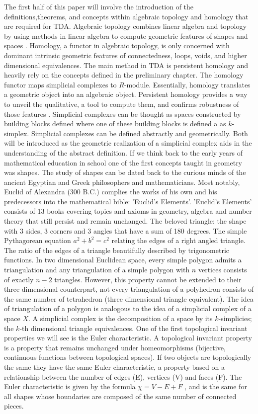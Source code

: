 \documentclass{article}
\begin{document}
The first half of this paper will involve the introduction of the definitions,theorems, and concepts within algebraic topology and homology that are required for TDA. Algebraic topology combines linear algebra and topology by using methods in linear algebra to compute geometric features of shapes and spaces\cite{AZComputePH} \cite{Maleti__2016} \cite{AZadvances}. Homology, a functor in algebraic topology, is only concerned with dominant intrinsic geometric features of connectedness, loops, voids, and higher dimensional equivalences. The main method in TDA is persistent homology and heavily rely on the concepts defined in the preliminary chapter. The homology functor maps simplicial complexes to $R$-module. Essentially, homology translates a geometric object into an algebraic object. Persistent homology provides a way to unveil the qualitative, a tool to compute them, and confirms robustness of those features \cite{smith2020topological}. Simplicial complexes can be thought as spaces constructed by building blocks defined where one of these building blocks is defined a as $k$-simplex. Simplicial complexes can be defined abstractly and geometrically. Both will be introduced as the geometric realization of a simplicial complex aids in the understanding of the abstract definition. If we think back to the early years of mathematical education in school one of the first concepts taught in geometry was shapes. The study of shapes can be dated back to the curious minds of the ancient Egyptian and Greek philosophers and mathematicians. Most notably, Euclid of Alexandra (300 B.C.) complies the works of his own and his predecessors into the mathematical bible: 'Euclid's Elements'. 'Euclid's Elements' consists of 13 books covering topics and axioms in geometry, algebra and number theory that still persist and remain unchanged. The beloved triangle: the shape with 3 sides, 3 corners and 3 angles that have a sum of 180 degrees. The simple Pythagorean equation $a^2 + b^2 = c^2$ relating the edges of a right angled triangle. The ratio of the edges of a triangle beautifully described by trigonometric functions. In two dimensional Euclidean space, every simple polygon admits a triangulation and any triangulation of a simple polygon with $n$ vertices consists of exactly $n-2$ triangles. However, this property cannot be extended to their three dimensional counterpart, not every triangulation of a polyhedron consists of the same number of tetrahedron (three dimensional triangle equivalent). The idea of triangulation of a polygon is analogous to the idea of a simplicial complex of a space $X$. A simplicial complex is the decomposition of a space by its $k$-simplicies; the $k$-th dimensional triangle equivalences. One of the first topological invariant properties we will see is the Euler characteristic. A topological invariant property is a property that remains unchanged under homeomorphisms (bijective, continuous functions between topological spaces). If two objects are topologically the same they have the same Euler characteristic, a property based on a relationship between the number of edges (E), vertices (V) and faces (F). The Euler characteristic is given by the formula $\chi = V - E + F $ , and is the same for all shapes whose boundaries are composed of the same number of connected pieces. 
\end{document}
